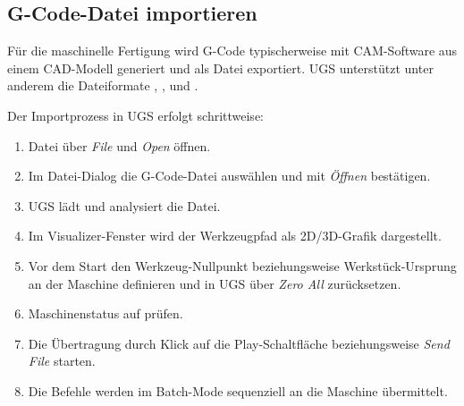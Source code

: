 \subsection{G-Code-Datei importieren}

Für die maschinelle Fertigung wird G-Code typischerweise mit CAM-Software aus einem CAD-Modell generiert und als Datei exportiert. UGS unterstützt unter anderem die Dateiformate , ,  und  \cite{ugs:github}.

Der Importprozess in UGS erfolgt schrittweise:

\begin{enumerate}
	\item Datei über \emph{File} und \emph{Open} öffnen.
	\item Im Datei-Dialog die G-Code-Datei auswählen und mit \emph{Öffnen} bestätigen.
	\item UGS lädt und analysiert die Datei.
	\item Im Visualizer-Fenster wird der Werkzeugpfad als 2D/3D-Grafik dargestellt.
	\item Vor dem Start den Werkzeug-Nullpunkt beziehungsweise Werkstück-Ursprung an der Maschine definieren und in UGS über \emph{Zero All} zurücksetzen.
	\item Maschinenstatus auf  prüfen.
	\item Die Übertragung durch Klick auf die Play-Schaltfläche beziehungsweise \emph{Send File} starten.
	\item Die Befehle werden im Batch-Mode sequenziell an die Maschine übermittelt.
\end{enumerate}
